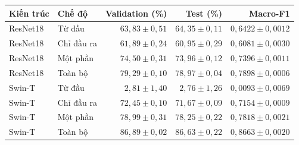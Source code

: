 \begin{tabular}{llrrr}
\toprule
Kiến trúc & Chế độ & Validation (\%) & Test (\%) & Macro-F1 \\
\midrule
ResNet18 & Từ đầu & $63{,}83 \pm 0{,}51$ & $64{,}35 \pm 0{,}11$ & $0{,}6422 \pm 0{,}0012$ \\
ResNet18 & Chỉ đầu ra & $61{,}89 \pm 0{,}24$ & $60{,}95 \pm 0{,}29$ & $0{,}6081 \pm 0{,}0030$ \\
ResNet18 & Một phần & $74{,}50 \pm 0{,}31$ & $73{,}96 \pm 0{,}12$ & $0{,}7396 \pm 0{,}0011$ \\
ResNet18 & Toàn bộ & $79{,}29 \pm 0{,}10$ & $78{,}97 \pm 0{,}04$ & $0{,}7898 \pm 0{,}0006$ \\
Swin-T & Từ đầu & $2{,}81 \pm 1{,}40$ & $2{,}76 \pm 1{,}26$ & $0{,}0093 \pm 0{,}0069$ \\
Swin-T & Chỉ đầu ra & $72{,}45 \pm 0{,}10$ & $71{,}67 \pm 0{,}09$ & $0{,}7154 \pm 0{,}0009$ \\
Swin-T & Một phần & $78{,}99 \pm 0{,}31$ & $78{,}25 \pm 0{,}22$ & $0{,}7818 \pm 0{,}0021$ \\
Swin-T & Toàn bộ & $86{,}89 \pm 0{,}02$ & $86{,}63 \pm 0{,}22$ & $0{,}8663 \pm 0{,}0020$ \\
\bottomrule
\end{tabular}
